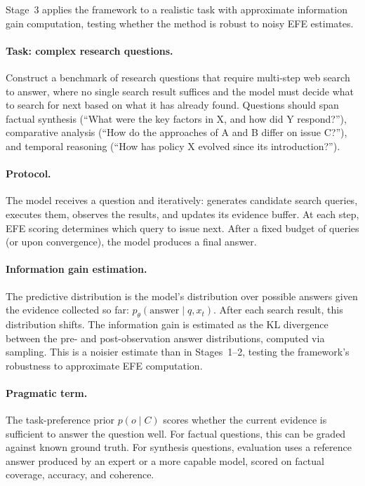 \documentclass[11pt]{article}
\begin{document}
Stage~3 applies the framework to a realistic task with approximate information gain computation, testing whether the method is robust to noisy EFE estimates.

\paragraph{Task: complex research questions.}
Construct a benchmark of research questions that require multi-step web search to answer, where no single search result suffices and the model must decide what to search for next based on what it has already found. Questions should span factual synthesis (``What were the key factors in X, and how did Y respond?''), comparative analysis (``How do the approaches of A and B differ on issue C?''), and temporal reasoning (``How has policy X evolved since its introduction?'').

\paragraph{Protocol.}
The model receives a question and iteratively: generates candidate search queries, executes them, observes the results, and updates its evidence buffer. At each step, EFE scoring determines which query to issue next. After a fixed budget of queries (or upon convergence), the model produces a final answer.

\paragraph{Information gain estimation.}
The predictive distribution is the model's distribution over possible answers given the evidence collected so far: $p_\theta(\text{answer} \mid q, x_t)$. After each search result, this distribution shifts. The information gain is estimated as the KL divergence between the pre- and post-observation answer distributions, computed via sampling. This is a noisier estimate than in Stages~1--2, testing the framework's robustness to approximate EFE computation.

\paragraph{Pragmatic term.}
The task-preference prior $p(o \mid C)$ scores whether the current evidence is sufficient to answer the question well. For factual questions, this can be graded against known ground truth. For synthesis questions, evaluation uses a reference answer produced by an expert or a more capable model, scored on factual coverage, accuracy, and coherence.
\end{document}
